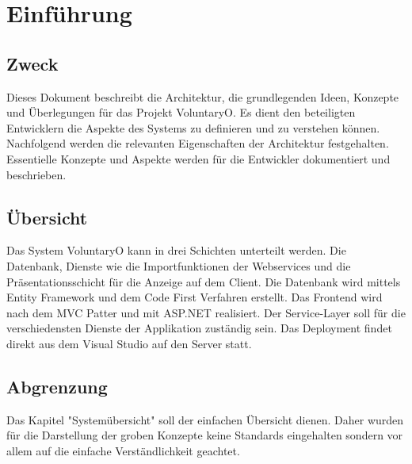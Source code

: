 \chapter{Einführung}
	\section{Zweck}
	Dieses Dokument beschreibt die Architektur, die grundlegenden Ideen, Konzepte und Überlegungen für das Projekt VoluntaryO. Es dient den beteiligten Entwicklern die Aspekte des Systems zu definieren und zu verstehen können.
	Nachfolgend werden die relevanten Eigenschaften der Architektur festgehalten. Essentielle Konzepte und Aspekte werden für die Entwickler dokumentiert und beschrieben.
	
	\section{Übersicht}
	Das System VoluntaryO kann in drei Schichten unterteilt werden. Die Datenbank, Dienste wie die Importfunktionen der Webservices und die Präsentationsschicht für die Anzeige auf dem Client.
	Die Datenbank wird mittels Entity Framework und dem Code First Verfahren erstellt. Das Frontend wird nach dem MVC Patter und mit ASP.NET realisiert. Der Service-Layer soll für die verschiedensten Dienste der Applikation zuständig sein.
	Das Deployment findet direkt aus dem Visual Studio auf den Server statt.

	\section{Abgrenzung}
	Das Kapitel "Systemübersicht" soll der einfachen Übersicht dienen. Daher wurden für die Darstellung der groben Konzepte keine Standards eingehalten sondern vor allem auf die einfache Verständlichkeit geachtet.
